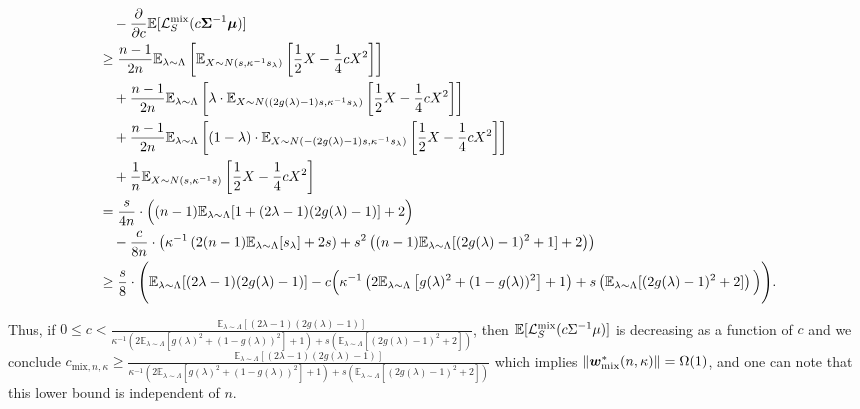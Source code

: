 \begin{align*}
    &\quad -\frac{\partial}{\partial c } \mathbb{E}[\mathcal{L}_S^\mathrm{mix}(c {\bm{\Sigma}}^{-1}{\bm{\mu}})] \\
    &\geq \frac{n-1}{2n} \mathbb{E}_{\lambda \sim \Lambda}\left[\mathbb{E}_{X \sim N(s, \kappa^{-1} s_\lambda) } \left[\frac{1}{2}X - \frac{1}{4} c X^2 \right]\right] \\
    &\quad+ \frac{n-1}{2n} \mathbb{E}_{\lambda \sim \Lambda}\left[\lambda \cdot \mathbb{E}_{X \sim N((2g(\lambda)-1)s, \kappa^{-1} s_\lambda) }\left[\frac{1}{2}X - \frac{1}{4} c X^2\right]\right] \\
    &\quad+ \frac{n-1}{2n} \mathbb{E}_{\lambda \sim \Lambda}\left[(1-\lambda) \cdot\mathbb{E}_{X \sim N(-(2g(\lambda)-1)s, \kappa^{-1} s_\lambda) }\left[\frac{1}{2}X - \frac{1}{4} c X^2\right]\right] \\
    &\quad+ \frac{1}{n} \mathbb{E}_{X \sim N(s,\kappa^{-1}s) }\left[\frac{1}{2}X - \frac{1}{4} c X^2\right]\\
    &= \frac{s}{4n} \cdot \Big((n-1)\mathbb{E}_{\lambda \sim \Lambda}[1+(2\lambda-1)(2g(\lambda)-1)]+2 \Big) \\
    &\quad - \frac{c}{8n} \cdot \left( \kappa^{-1} \left( 2 (n-1) \mathbb{E}_{\lambda \sim \Lambda}[ s_\lambda]+ 2s \right) +s^2 \left((n-1)\mathbb{E}_{\lambda \sim \Lambda}[(2g(\lambda)-1)^2 +1] +2 \right)  \right) \\
    & \geq \frac{s}{8} \cdot \Bigg( \mathbb{E}_{\lambda \sim \Lambda}[(2\lambda-1)(2 g(\lambda)-1)] - c  \Big(\kappa^{-1} \left(2\mathbb{E}_{\lambda \sim \Lambda}\left[g(\lambda)^2 + (1-g(\lambda))^2 \right]+1\right) + s\left( \mathbb{E}_{\lambda \sim \Lambda}[(2g(\lambda)-1)^2+2]\right)\Big)\Bigg).
\end{align*}

Thus, if $0 \leq c <\frac{\mathbb{E}_{\lambda \sim \Lambda}\left[ (2\lambda-1)(2g(\lambda)-1)\right]}{ \kappa^{-1} \left(2\mathbb{E}_{\lambda \sim \Lambda}\left[g(\lambda)^2 + (1-g(\lambda))^2 \right]+1\right) + s\left( \mathbb{E}_{\lambda \sim \Lambda}[(2g(\lambda)-1)^2+2]\right)}$, then $\mathbb{E}[\mathcal{L}_S^\mathrm{mix}(c \Sigma^{-1}\mu)]$ is decreasing as a function of $c$ and we conclude $c_{\mathrm{mix},n,\kappa }\geq \frac{\mathbb{E}_{\lambda \sim \Lambda}\left[ (2\lambda-1)(2g(\lambda)-1)\right]}{ \kappa^{-1} \left(2\mathbb{E}_{\lambda \sim \Lambda}\left[g(\lambda)^2 + (1-g(\lambda))^2 \right]+1\right) + s\left( \mathbb{E}_{\lambda \sim \Lambda}[(2g(\lambda)-1)^2+2]\right)}$ which implies $\lVert {\bm{w}}^*_\mathrm{mix}(n,\kappa) \rVert = \Omega(1)$, and one can note that this lower bound is independent of $n$.

